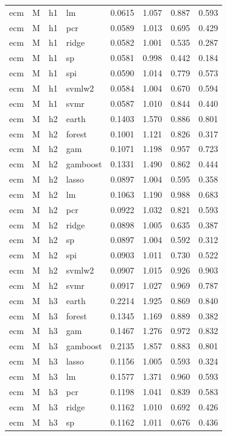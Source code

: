 \begin{ThreePartTable}
\begin{longtable}[t]{llclcccc}
ecm & M & h1 & lm & 0.0615 & 1.057 & 0.887 & 0.593\\
ecm & M & h1 & pcr & 0.0589 & 1.013 & 0.695 & 0.429\\
ecm & M & h1 & ridge & 0.0582 & 1.001 & 0.535 & 0.287\\
ecm & M & h1 & sp & 0.0581 & 0.998 & 0.442 & 0.184\\
ecm & M & h1 & spi & 0.0590 & 1.014 & 0.779 & 0.573\\
ecm & M & h1 & svmlw2 & 0.0584 & 1.004 & 0.670 & 0.594\\
ecm & M & h1 & svmr & 0.0587 & 1.010 & 0.844 & 0.440\\
\addlinespace
ecm & M & h2 & earth & 0.1403 & 1.570 & 0.886 & 0.801\\
ecm & M & h2 & forest & 0.1001 & 1.121 & 0.826 & 0.317\\
ecm & M & h2 & gam & 0.1071 & 1.198 & 0.957 & 0.723\\
ecm & M & h2 & gamboost & 0.1331 & 1.490 & 0.862 & 0.444\\
ecm & M & h2 & lasso & 0.0897 & 1.004 & 0.595 & 0.358\\
ecm & M & h2 & lm & 0.1063 & 1.190 & 0.988 & 0.683\\
ecm & M & h2 & pcr & 0.0922 & 1.032 & 0.821 & 0.593\\
ecm & M & h2 & ridge & 0.0898 & 1.005 & 0.635 & 0.387\\
ecm & M & h2 & sp & 0.0897 & 1.004 & 0.592 & 0.312\\
ecm & M & h2 & spi & 0.0903 & 1.011 & 0.730 & 0.522\\
ecm & M & h2 & svmlw2 & 0.0907 & 1.015 & 0.926 & 0.903\\
ecm & M & h2 & svmr & 0.0917 & 1.027 & 0.969 & 0.787\\
\addlinespace
ecm & M & h3 & earth & 0.2214 & 1.925 & 0.869 & 0.840\\
ecm & M & h3 & forest & 0.1345 & 1.169 & 0.889 & 0.382\\
ecm & M & h3 & gam & 0.1467 & 1.276 & 0.972 & 0.832\\
ecm & M & h3 & gamboost & 0.2135 & 1.857 & 0.883 & 0.801\\
ecm & M & h3 & lasso & 0.1156 & 1.005 & 0.593 & 0.324\\
ecm & M & h3 & lm & 0.1577 & 1.371 & 0.960 & 0.593\\
ecm & M & h3 & pcr & 0.1198 & 1.041 & 0.839 & 0.583\\
ecm & M & h3 & ridge & 0.1162 & 1.010 & 0.692 & 0.426\\
ecm & M & h3 & sp & 0.1162 & 1.011 & 0.676 & 0.436\\

\end{longtable}
\end{ThreePartTable}
